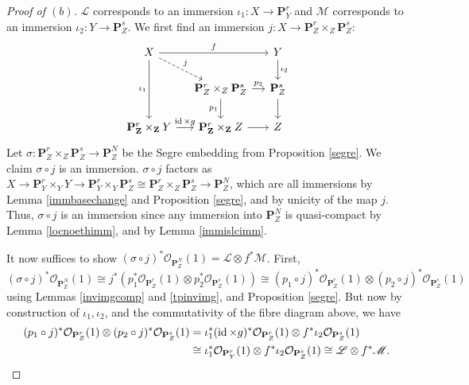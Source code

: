 \documentclass[12pt,letterpaper]{article}
\theoremstyle{definition}
\theoremstyle{remark}
\numberwithin{equation}{section}
\numberwithin{figure}{problem}
\DeclareMathOperator{\id}{id}
\newcommand{\LL}{\mathscr{L}}
\newcommand{\MM}{\mathscr{M}}
\newcommand{\OO}{\mathcal{O}}
\begin{document}
\begin{proof}[Proof of $(b)$]
  $\LL$ corresponds to an immersion $\iota_1\colon X \to \mathbf{P}^r_Y$ and $\MM$ corresponds to an immersion $\iota_2\colon Y \to \mathbf{P}^s_Z$. We first find an immersion $j\colon X \to \mathbf{P}^r_Z \times_Z \mathbf{P}^s_Z$:
  \begin{equation*}
    \begin{tikzcd}[column sep=small]
      X\arrow{dd}[swap]{\iota_1} \arrow{rr}{f}\arrow[dashed]{dr}{j} & & Y\dar{\iota_2}\\
      & \mathbf{P}^r_Z \times_Z \mathbf{P}^s_Z\dar[swap]{p_1}\rar{p_2} & \mathbf{P}^s_Z\dar\\
      \mathbf{P}^r_{\mathbf{Z}} \times_{\mathbf{Z}} Y \rar{\id \times g} & \mathbf{P}^r_{\mathbf{Z}} \times_{\mathbf{Z}} Z \rar & Z
    \end{tikzcd}
  \end{equation*}
  Let $\sigma\colon \mathbf{P}^r_Z \times_Z \mathbf{P}^s_Z \to \mathbf{P}^N_Z$ be the Segre embedding from Proposition \ref{segre}. We claim $\sigma \circ j$ is an immersion. $\sigma \circ j$ factors as $X \to \mathbf{P}^r_Y \times_Y Y \to \mathbf{P}^r_Y \times_Y \mathbf{P}^s_Z \cong \mathbf{P}^r_Z \times_Z \mathbf{P}^s_Z \to \mathbf{P}^N_Z$, which are all immersions by Lemma \ref{immbasechange} and Proposition \ref{segre}, and by unicity of the map $j$. Thus, $\sigma \circ j$ is an immersion since any immersion into $\mathbf{P}^N_Z$ is quasi-compact by Lemma \ref{locnoethimm}, and by Lemma \ref{immislcimm}.
  \par It now suffices to show $(\sigma \circ j)^*\OO_{\mathbf{P}^N_Z}(1) = \LL \otimes f^*\MM$. First,
  \begin{equation*}
    (\sigma \circ j)^*\OO_{\mathbf{P}^N_Z}(1) \cong j^*(p_1^*\OO_{\mathbf{P}^r_Z}(1) \otimes p_2^*\OO_{\mathbf{P}^s_Z}(1)) \cong (p_1 \circ j)^*\OO_{\mathbf{P}^r_Z}(1) \otimes (p_2 \circ j)^*\OO_{\mathbf{P}^s_Z}(1)
  \end{equation*}
  using Lemmas \ref{invimgcomp} and \ref{tpinvimg}, and Proposition \ref{segre}. But now by construction of $\iota_1,\iota_2$, and the commutativity of the fibre diagram above, we have
  \begin{align*}
    (p_1 \circ j)^*\OO_{\mathbf{P}^r_Z}(1) \otimes (p_2 \circ j)^*\OO_{\mathbf{P}^s_Z}(1) &= \iota_1^*(\id \times g)^*\OO_{\mathbf{P}^r_Z}(1) \otimes f^*\iota_2\OO_{\mathbf{P}^s_Z}(1)\\
    &\cong \iota_1^*\OO_{\mathbf{P}^r_Y}(1) \otimes f^*\iota_2\OO_{\mathbf{P}^s_Z}(1) \cong \LL \otimes f^*\MM.\qedhere
  \end{align*}
\end{proof}
\end{document}
